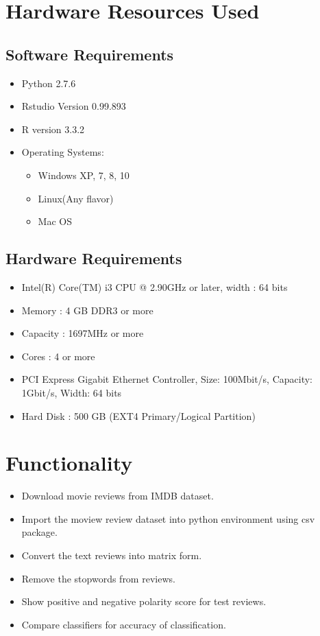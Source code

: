 \documentclass[oneside,a4paper,12pt]{pictreport}
\begin{document}
\section{Hardware Resources Used}
\subsection{Software Requirements}
\begin{itemize}
				\item Python 2.7.6 
				\item Rstudio Version 0.99.893 
				\item R version 3.3.2
				\item Operating Systems:
					\begin{itemize}
						\item Windows XP, 7, 8, 10
						\item Linux(Any flavor)
						\item Mac OS 
					\end{itemize}
\end{itemize}
\subsection{Hardware Requirements}
			\begin{itemize}
				\item Intel(R) Core(TM) i3 CPU @ 2.90GHz or later, width : 64 bits
				\item Memory : 4 GB DDR3 or more
				\item Capacity : 1697MHz or more
				\item Cores : 4 or more
				\item PCI Express Gigabit Ethernet Controller, Size: 100Mbit/s, Capacity: 1Gbit/s, Width: 64 bits
				\item Hard Disk : 500 GB (EXT4 Primary/Logical Partition)
			\end{itemize}
		
\newpage

\section{Functionality}
\begin{itemize}
\item Download movie reviews from IMDB dataset.
\item Import the moview review dataset into python environment using csv package.

\item Convert the text reviews into matrix form.
\item Remove the stopwords from reviews.
\item Show positive and negative polarity score for test reviews.


\item Compare classifiers for accuracy of classification.
\end{itemize} 
\end{document}
